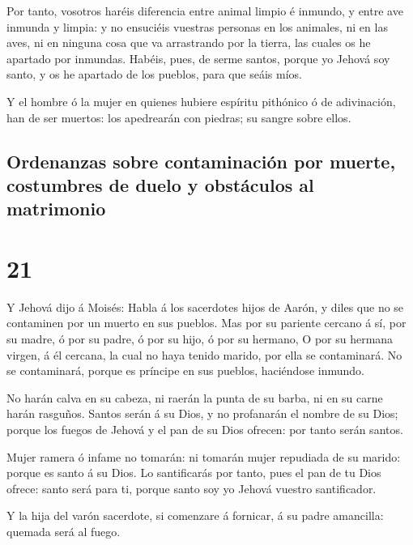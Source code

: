  Por tanto, vosotros haréis diferencia entre animal
limpio é inmundo, y entre ave inmunda y limpia: y no ensuciéis vuestras
personas en los animales, ni en las aves, ni en ninguna cosa que va
arrastrando por la tierra, las cuales os he apartado por inmundas.
 Habéis, pues, de serme santos, porque yo Jehová soy
santo, y os he apartado de los pueblos, para que seáis míos.

 Y el hombre ó la mujer en quienes hubiere espíritu
pithónico ó de adivinación, han de ser muertos: los apedrearán con
piedras; su sangre sobre ellos.

\hypertarget{ordenanzas-sobre-contaminaciuxf3n-por-muerte-costumbres-de-duelo-y-obstuxe1culos-al-matrimonio}{%
\subsection{Ordenanzas sobre contaminación por muerte, costumbres de
duelo y obstáculos al
matrimonio}\label{ordenanzas-sobre-contaminaciuxf3n-por-muerte-costumbres-de-duelo-y-obstuxe1culos-al-matrimonio}}

\hypertarget{section-20}{%
\section{21}\label{section-20}}

 Y Jehová dijo á Moisés: Habla á los sacerdotes hijos de
Aarón, y diles que no se contaminen por un muerto en sus pueblos.
 Mas por su pariente cercano á sí, por su madre, ó por su
padre, ó por su hijo, ó por su hermano,  O por su hermana
virgen, á él cercana, la cual no haya tenido marido, por ella se
contaminará.  No se contaminará, porque es príncipe en sus
pueblos, haciéndose inmundo.

 No harán calva en su cabeza, ni raerán la punta de su
barba, ni en su carne harán rasguños.  Santos serán á su
Dios, y no profanarán el nombre de su Dios; porque los fuegos de Jehová
y el pan de su Dios ofrecen: por tanto serán santos.

 Mujer ramera ó infame no tomarán: ni tomarán mujer
repudiada de su marido: porque es santo á su Dios.  Lo
santificarás por tanto, pues el pan de tu Dios ofrece: santo será para
ti, porque santo soy yo Jehová vuestro santificador.

 Y la hija del varón sacerdote, si comenzare á fornicar, á
su padre amancilla: quemada será al fuego.

